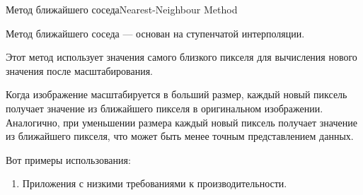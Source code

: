 \documentclass{beamer}
\begin{document}
	\begin{frame}{Метод ближайшего соседа}{Nearest-Neighbour Method}

	 	Метод ближайшего соседа --- основан на ступенчатой интерполяции.

		Этот метод использует значения самого близкого пикселя для вычисления нового значения после масштабирования.

		Когда изображение масштабируется в больший размер, каждый новый пиксель получает значение из ближайшего пикселя в оригинальном изображении. Аналогично, при уменьшении размера каждый новый пиксель получает значение из ближайшего пикселя, что может быть менее точным представлением данных.
				
		Вот примеры использования:
		
		\begin{enumerate}
			\item 
			Приложения с низкими требованиями к производительности.
		\end{enumerate}





		
	\end{frame}
	
\end{document}
